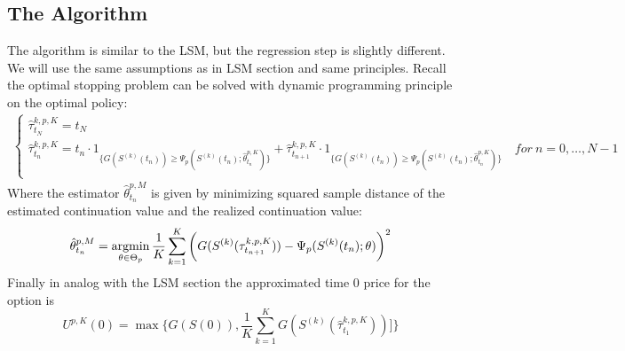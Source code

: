 \subsection{The Algorithm}
The algorithm is similar to the LSM, but the regression step is slightly different. We will use the same assumptions as in LSM section and same principles. Recall the optimal stopping problem can be solved with dynamic programming principle on the optimal policy:
\begin{equation}\label{LSMDynamic3}
\begin{split}
\begin{cases}
          \hat{\tau}_{t_N}^{k,p,K} = t_N\\
          \hat{\tau}_{t_n}^{k,p,K} = t_n \cdot 1_{\{G(S^{(k)}(t_n)) \geq \Psi_p(S^{(k)}(t_n) ; \hat{\theta}_{t_n}^{p,K} ) \}} + \hat{\tau}_{t_{n+1}}^{k,p,K} \cdot 1_{\{G(S^{(k)}(t_n)) \geq \Psi_p(S^{(k)}(t_n) ; \hat{\theta}_{t_n}^{p,K} ) \}} \quad for \ n={0,\ldots,N-1} \\ 
\end{cases}
\end{split}
\end{equation}
Where the estimator $\hat{\theta}_{t_n}^{p,M}$ is given by minimizing squared sample distance of the estimated continuation value and the realized continuation value:
\begin{align*}
\hat{\theta}_{t_n}^{p,M}= \operatorname*{argmin}_{\theta \in \Theta_p} \dfrac{1}{K} \sum_{k=1}^{K} \bigg(G(S^{(k)}(\tau^{k,p,K}_{t_{n+1}}))  - \Psi_p(S^{(k)}(t_n) ; \theta ) \bigg)^2
\end{align*}
Finally in analog with the LSM section the approximated time 0 price for the option is
\begin{equation}
U^{p,K}(0) = \max \{ G(S(0)), \frac{1}{K} \sum_{k=1}^{K} G(S^{(k)}(\hat{\tau}^{k,p,K}_{t_1}))]\}
\end{equation}

